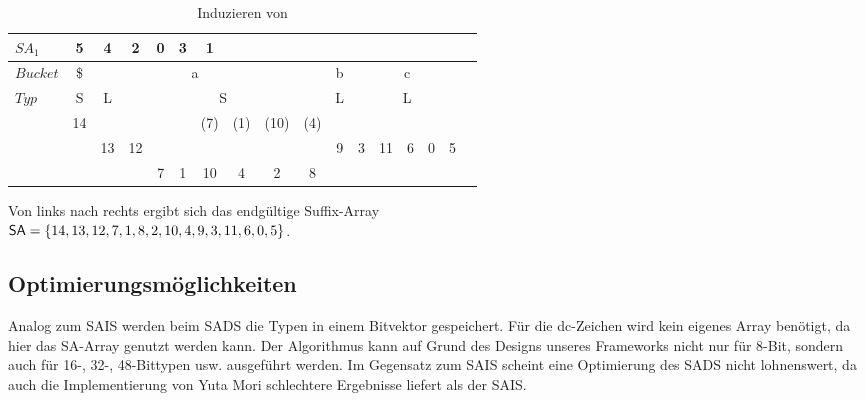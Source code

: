 \begin{table}[H]
\centering
\begin{adjustbox}{width=1\textwidth}
  \begin{tabular}{ | l | c | c | c | c | c | c | c | c | c | c | c | c | c | c | c | c | }
    \hline
     $SA_1$ & 5 & 4 & 2 & 0 & 3 & 1 & & & & & & & & & \\ \hline
   $Bucket$ &\$ & \multicolumn{7}{c}{a} &   & \multicolumn{1}{c}{b} &   & \multicolumn{3}{c}{c} & \\ \hline
      $Typ$ & S & \multicolumn{1}{c}{L} &   & \multicolumn{5}{c}{S} &   & \multicolumn{1}{c}{L} &    & \multicolumn{3}{c}{L} &\\ \hline
            & 14 & & & & & (7) & (1) & (10) & (4) & & & & & & \\ \hline
            & & 13 & 12 & & & & & & & 9 & 3 & 11 & 6 & 0 & 5 \\ \hline
            & & & & 7 & 1 & 10 & 4 & 2 & 8 & & & & & & \\
    \hline
  \end{tabular}
  \end{adjustbox}
  \caption{Induzieren von \sa}
\end{table}
\bigskip
\noindent Von links nach rechts ergibt sich das endgültige Suffix-Array \\
$\sa = \{14, 13, 12, 7, 1, 8, 2, 10, 4, 9, 3, 11, 6, 0, 5\}$.

\subsection{Optimierungsmöglichkeiten}
Analog zum SAIS werden beim SADS die Typen in einem Bitvektor gespeichert. Für die dc-Zeichen wird kein eigenes Array benötigt, da hier das SA-Array genutzt werden kann. Der Algorithmus kann auf Grund des Designs unseres Frameworks nicht nur für 8-Bit, sondern auch für 16-, 32-, 48-Bittypen usw. ausgeführt werden. Im Gegensatz zum SAIS scheint eine Optimierung des SADS nicht lohnenswert, da auch die Implementierung von Yuta Mori schlechtere Ergebnisse liefert als der SAIS.
 \newpage





























